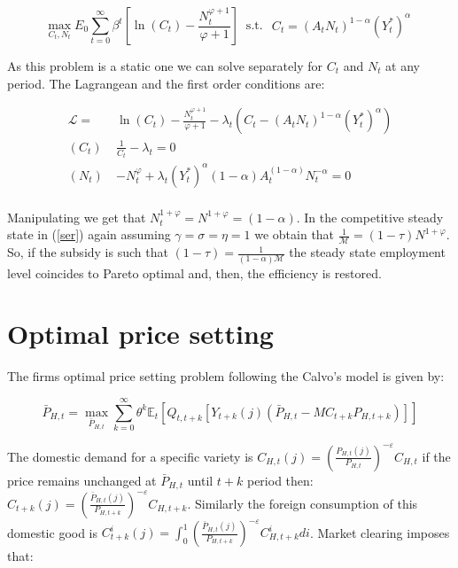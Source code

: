 \documentclass{article}
\newcommand{\Et}{\mathbb{E}_t}
\begin{document}
$$\max_{C_t, N_t} E_0 \sum^\infty_{t=0} \beta^t \left[\ln(C_t) - \frac{N_t^{\varphi+1}}{\varphi+1} \right] \ \textrm{ s.t. } \begin{matrix}
    C_t = (A_t N_t)^{1-\alpha}(Y_t^*)^\alpha
\end{matrix}$$

As this problem is a static one we can solve separately for $C_t$ and $N_t$ at any period. The Lagrangean and the first order conditions are:

\begin{equation*}
    \begin{split}
        \mathcal L = & \ln(C_t) - \frac{N_t^{\varphi+1}}{\varphi+1} - \lambda_t(C_t - (A_t N_t)^{1-\alpha}(Y_t^*)^\alpha) \\
        (C_t) \ & \frac{1}{C_t} - \lambda_t = 0\\
        (N_t) \ & -N_t^\varphi + \lambda_t (Y_t^*)^\alpha (1 - \alpha) A_t^{(1 - \alpha)}N_t^{-\alpha} = 0\\
    \end{split}
\end{equation*}

Manipulating we get that $N_t^{1+\varphi} = N^{1+\varphi} = (1-\alpha)$. In the competitive steady state in (\ref{ser}) again assuming $\gamma = \sigma = \eta = 1$ we obtain that $\frac{1}{\mathcal M} = (1-\tau) N^{1+\varphi}$. So, if the subsidy is such that $(1-\tau) = \frac{1}{(1-\alpha) \mathcal M}$ the steady state employment level coincides to Pareto optimal and, then, the efficiency is restored.

\section{Optimal price setting}
The firms optimal price setting problem following the Calvo's model is given by:

\begin{equation}
    \bar P_{H,t} = \max_{\bar P_{H,t}} \sum^\infty_{k=0} \theta^k \Et \left[ Q_{t, t+k}[Y_{t+k}(j) (\bar P_{H,t} - MC_{t+k} P_{H,t+k})] \right]
\end{equation}

The domestic demand for a specific variety is $C_{H,t}(j) = \left( \frac{P_{H,t}(j)}{P_{H,t}} \right)^{-\varepsilon} C_{H, t}$ if the price remains unchanged at $\bar P_{H,t}$ until $t+k$ period then: $C_{t+k}(j) = \left( \frac{\bar P_{H,t}(j)}{P_{H,t+k}}\right)^{-\varepsilon} C_{H, t+k}$. Similarly the foreign consumption of this domestic good is $C^i_{t+k}(j) = \int^1_0 \left( \frac{\bar P_{H,t}(j)}{P_{H,t+k}} \right)^{-\varepsilon} C^i_{H, t+k} di$. Market clearing imposes that:
\end{document}
